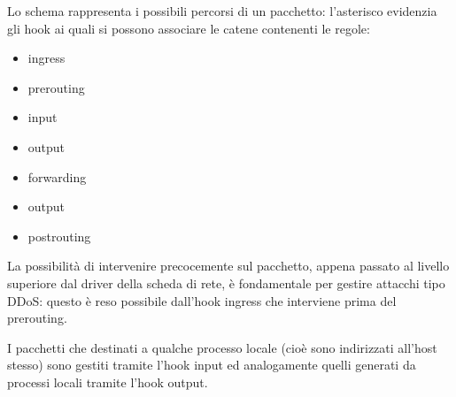 
Lo schema rappresenta i possibili percorsi di un pacchetto: l'asterisco
evidenzia gli hook ai quali si possono associare le catene contenenti le
regole:
\begin{itemize}
  \item ingress
  \item prerouting
  \item input
  \item output
  \item forwarding
  \item output
  \item postrouting
\end{itemize}
\noindent La possibilit\`a di intervenire precocemente sul pacchetto, appena
passato al livello superiore dal driver della scheda di rete, \`e fondamentale
per gestire attacchi tipo DDoS: questo \`e reso possibile dall'hook ingress
che interviene prima del prerouting.

I pacchetti che destinati a qualche processo locale (cioè sono indirizzati
all'host stesso) sono gestiti tramite l'hook input ed analogamente quelli
generati da processi locali tramite l'hook output.

